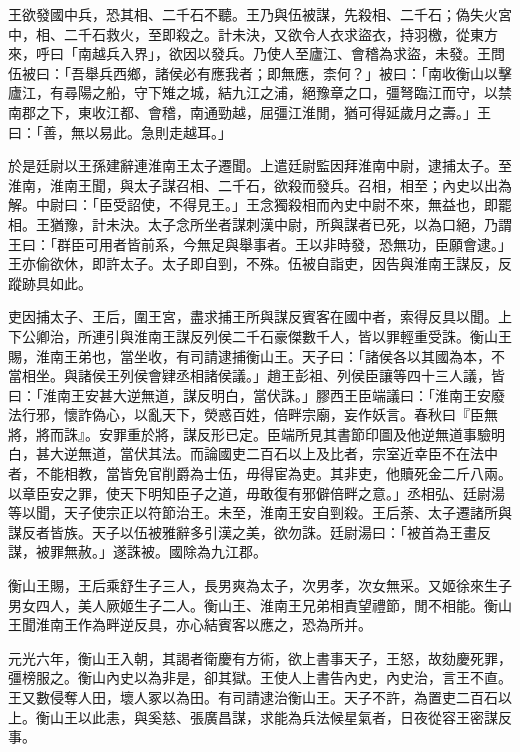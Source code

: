 \begin{pinyinscope}
王欲發國中兵，恐其相、二千石不聽。王乃與伍被謀，先殺相、二千石；偽失火宮中，相、二千石救火，至即殺之。計未決，又欲令人衣求盜衣，持羽檄，從東方來，呼曰「南越兵入界」，欲因以發兵。乃使人至廬江、會稽為求盜，未發。王問伍被曰：「吾舉兵西鄉，諸侯必有應我者；即無應，柰何？」被曰：「南收衡山以擊廬江，有尋陽之船，守下雉之城，結九江之浦，絕豫章之口，彊弩臨江而守，以禁南郡之下，東收江都、會稽，南通勁越，屈彊江淮閒，猶可得延歲月之壽。」王曰：「善，無以易此。急則走越耳。」

於是廷尉以王孫建辭連淮南王太子遷聞。上遣廷尉監因拜淮南中尉，逮捕太子。至淮南，淮南王聞，與太子謀召相、二千石，欲殺而發兵。召相，相至；內史以出為解。中尉曰：「臣受詔使，不得見王。」王念獨殺相而內史中尉不來，無益也，即罷相。王猶豫，計未決。太子念所坐者謀刺漢中尉，所與謀者已死，以為口絕，乃謂王曰：「群臣可用者皆前系，今無足與舉事者。王以非時發，恐無功，臣願會逮。」王亦偷欲休，即許太子。太子即自剄，不殊。伍被自詣吏，因告與淮南王謀反，反蹤跡具如此。

吏因捕太子、王后，圍王宮，盡求捕王所與謀反賓客在國中者，索得反具以聞。上下公卿治，所連引與淮南王謀反列侯二千石豪傑數千人，皆以罪輕重受誅。衡山王賜，淮南王弟也，當坐收，有司請逮捕衡山王。天子曰：「諸侯各以其國為本，不當相坐。與諸侯王列侯會肄丞相諸侯議。」趙王彭祖、列侯臣讓等四十三人議，皆曰：「淮南王安甚大逆無道，謀反明白，當伏誅。」膠西王臣端議曰：「淮南王安廢法行邪，懷詐偽心，以亂天下，熒惑百姓，倍畔宗廟，妄作妖言。春秋曰『臣無將，將而誅』。安罪重於將，謀反形已定。臣端所見其書節印圖及他逆無道事驗明白，甚大逆無道，當伏其法。而論國吏二百石以上及比者，宗室近幸臣不在法中者，不能相教，當皆免官削爵為士伍，毋得宦為吏。其非吏，他贖死金二斤八兩。以章臣安之罪，使天下明知臣子之道，毋敢復有邪僻倍畔之意。」丞相弘、廷尉湯等以聞，天子使宗正以符節治王。未至，淮南王安自剄殺。王后荼、太子遷諸所與謀反者皆族。天子以伍被雅辭多引漢之美，欲勿誅。廷尉湯曰：「被首為王畫反謀，被罪無赦。」遂誅被。國除為九江郡。

衡山王賜，王后乘舒生子三人，長男爽為太子，次男孝，次女無采。又姬徐來生子男女四人，美人厥姬生子二人。衡山王、淮南王兄弟相責望禮節，閒不相能。衡山王聞淮南王作為畔逆反具，亦心結賓客以應之，恐為所并。

元光六年，衡山王入朝，其謁者衛慶有方術，欲上書事天子，王怒，故劾慶死罪，彊榜服之。衡山內史以為非是，卻其獄。王使人上書告內史，內史治，言王不直。王又數侵奪人田，壞人冢以為田。有司請逮治衡山王。天子不許，為置吏二百石以上。衡山王以此恚，與奚慈、張廣昌謀，求能為兵法候星氣者，日夜從容王密謀反事。


\end{pinyinscope}

